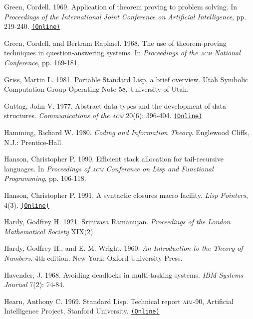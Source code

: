 \documentclass[oneside]{book}
\newcommand{\acronym}[1]{\textsc{\MakeLowercase{#1}}}
\newcommand{\code}[1]{\texttt{#1}}
\begin{document}
 \label{Green 1969}
Green, Cordell.  1969.  Application of theorem proving to problem solving.  In
\textit{Proceedings of the International Joint Conference on Artificial
Intelligence}, pp. 219-240.
\href{http://citeseer.ist.psu.edu/viewdoc/summary?doi=10.1.1.81.9820}{\code{(Online)}}

 \label{Green and Raphael (1968)}
Green, Cordell, and Bertram Raphael.  1968.  The use of theorem-proving
techniques in question-answering systems.  In \textit{Proceedings of the
\acronym{ACM} National Conference}, pp. 169-181.

 \label{Griss 1981}
Griss, Martin L.  1981.  Portable Standard Lisp, a brief overview.  Utah
Symbolic Computation Group Operating Note 58, University of Utah.

 \label{Guttag 1977}
Guttag, John V.  1977.  Abstract data types and the development of data
structures.  \textit{Communications of the \acronym{ACM}} 20(6): 396-404.
\href{http://www.unc.edu/~stotts/comp723/guttagADT77.pdf}{\code{(Online)}}

 \label{Hamming 1980}
Hamming, Richard W.  1980.  \textit{Coding and Information Theory}.  Englewood
Cliffs, N.J.: Prentice-Hall.

 \label{Hanson 1990}
Hanson, Christopher P.  1990.  Efficient stack allocation for tail-recur\-sive
languages.  In \textit{Proceedings of \acronym{ACM} Conference on Lisp and
Functional Programming}, pp. 106-118.

 \label{Hanson 1991}
Hanson, Christopher P.  1991.  A syntactic closures macro facility.  \textit{Lisp
Pointers}, 4(3).
\href{http://groups.csail.mit.edu/mac/ftpdir/scheme-reports/synclo.ps}{\code{(Online)}}

 \label{Hardy 1921}
Hardy, Godfrey H.  1921.  Srinivasa Ramanujan.  \textit{Proceedings of the London
Mathematical Society} XIX(2).

 \label{Hardy and Wright 1960}
Hardy, Godfrey H., and E. M. Wright.  1960.  \textit{An Introduction to the
Theory of Numbers}.  4th edition.  New York: Oxford University Press.

 \label{Havender (1968)}
Havender, J. 1968. Avoiding deadlocks in multi-tasking systems. \textit{IBM
Systems Journal} 7(2): 74-84.

 \label{Hearn 1969}
Hearn, Anthony C.  1969.  Standard Lisp.  Technical report \acronym{AIM}-90,
Artificial Intelligence Project, Stanford University.
\href{http://www.softwarepreservation.org/projects/LISP/stanford/Hearn-StandardLisp-AIM-90.pdf}{\code{(Online)}}
\end{document}
